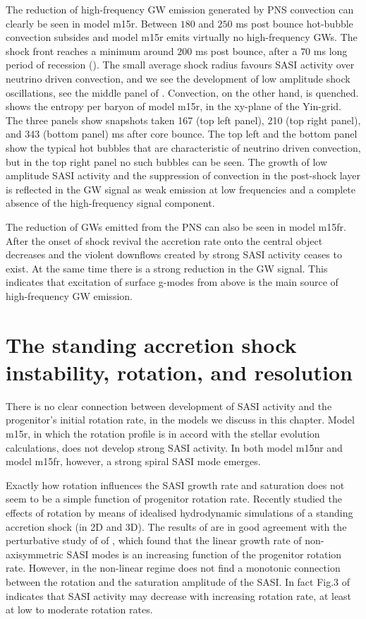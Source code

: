 The reduction of high-frequency GW emission generated by PNS convection can clearly be seen in model
m15r. Between $180$ and $250$ ms post bounce hot-bubble convection subsides and model m15r emits virtually no high-frequency GWs. The shock front reaches a minimum around $200$ ms post bounce, after
a $70$ ms long period of recession (). The small average shock radius favours SASI activity over
neutrino driven convection, and we see the development of low amplitude shock oscillations,
see the middle panel of . Convection, on the other hand, is quenched. 
 shows the entropy per baryon of model m15r, in the xy-plane of the Yin-grid.
The three panels show snapshots taken 167 (top left panel), 210 (top right panel), and 343 (bottom panel) ms
after core bounce. The top left and the bottom panel show the typical hot bubbles that are characteristic of
neutrino driven convection, but in the top right panel no such bubbles can be seen. 
The growth of low amplitude SASI activity and the suppression of convection in the post-shock layer is reflected
in the GW signal as weak emission at low frequencies and a complete absence of the high-frequency signal component.

The reduction of GWs emitted from the PNS can also be seen in model m15fr. After the onset of shock revival
the accretion rate onto the central object decreases and the violent downflows created by strong SASI activity 
ceases to exist. At the same time there is a strong reduction in the GW signal. This indicates
that excitation of surface g-modes from above is the main source of high-frequency GW emission.

\section{The standing accretion shock instability, rotation, and resolution}
There is no clear connection between development of SASI activity and the progenitor's initial rotation rate,
in the models we discuss in this chapter. Model m15r, in which the rotation profile is in accord with the stellar
evolution calculations, does not develop strong SASI activity. In both model m15nr and model m15fr, however, a strong spiral SASI mode emerges. 

Exactly how rotation influences the SASI growth rate and saturation does not seem to 
be a simple function of progenitor rotation rate. Recently \cite{blondin_17} studied the effects 
of rotation by means of idealised hydrodynamic simulations of a standing accretion shock (in 2D and 3D). 
The results of \cite{blondin_17} are in good agreement with the perturbative study of of \cite{yamasaki_08}, 
which found that the linear growth rate 
of non-axisymmetric SASI modes is an increasing function of the progenitor rotation rate.
However, in the non-linear regime \cite{kazeroni_17} does not find a monotonic connection between the
rotation and the saturation amplitude of the SASI. In fact Fig.3 of \cite{kazeroni_17} indicates that
SASI activity may decrease with increasing rotation rate, at least at low to moderate rotation rates. 

